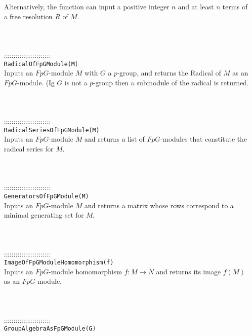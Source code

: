 \documentclass[a4paper,11pt]{report}
\begin{document}
{ Alternatively, the function can input a positive integer $n$ and at least $n$ terms of a free resolution $R$ of $M$. \\
 \\
 \\
 \\
 ::::::::::::::::::::::::\\
 \texttt{RadicalOfFpGModule(M) }\\
 

 Inputs an $FpG$-module $M$ with $G$ a $p$-group, and returns the Radical of $M$ as an $FpG$-module. (Ig $G$ is not a $p$-group then a submodule of the radical is returned. \\
 \\
 \\
 \\
 ::::::::::::::::::::::::\\
 \texttt{RadicalSeriesOfFpGModule(M) }\\
 

 Inputs an $FpG$-module $M$ and returns a list of $FpG$-modules that constitute the radical series for $M$. \\
 \\
 \\
 \\
 ::::::::::::::::::::::::\\
 \texttt{GeneratorsOfFpGModule(M) }\\
 

 Inputs an $FpG$-module $M$ and returns a matrix whose rows correspond to a minimal generating set for $M$. \\
 \\
 \\
 \\
 ::::::::::::::::::::::::\\
 \texttt{ImageOfFpGModuleHomomorphism(f) }\\
 

 Inputs an $FpG$-module homomorphism $f:M \longrightarrow N$ and returns its image $f(M)$ as an $FpG$-module. \\
 \\
 \\
 \\
 ::::::::::::::::::::::::\\
 \texttt{GroupAlgebraAsFpGModule(G) }\\
 

}
\end{document}
